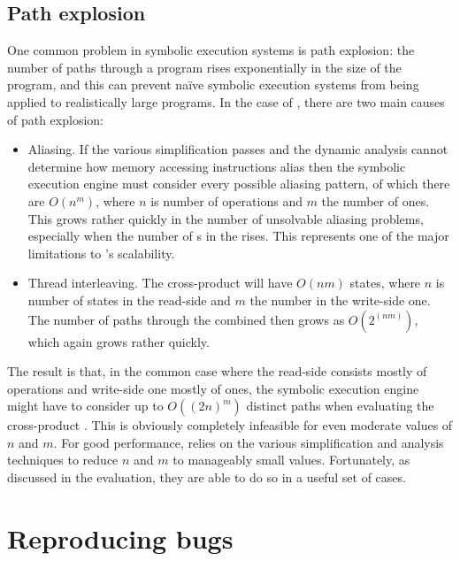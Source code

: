 \subsection{Path explosion}

One common problem in symbolic execution systems is path explosion:
the number of paths through a program rises exponentially in the size
of the program, and this can prevent na\"ive symbolic execution
systems from being applied to realistically large programs.  In the
case of \technique, there are two main causes of path explosion:

\begin{itemize}
\item
  Aliasing.  If the various simplification passes and the dynamic
  analysis cannot determine how memory accessing instructions alias
  then the symbolic execution engine must consider every possible
  aliasing pattern, of which there are $O(n^m)$, where $n$ is number
  of  operations and $m$ the number of  ones.
  This grows rather quickly in the number of unsolvable aliasing
  problems, especially when the number of s in the
  {\StateMachine} rises.  This represents one of the major limitations
  to \technique's scalability.
\item
  Thread interleaving.  The cross-product {\StateMachine} will have
  $O(nm)$ states, where $n$ is number of states in the read-side
  {\StateMachine} and $m$ the number in the write-side one.  The
  number of paths through the combined {\StateMachine} then grows as
  $O(2^{(nm)})$, which again grows rather quickly.
\end{itemize}

The result is that, in the common case where the read-side
{\StateMachine} consists mostly of  operations and
write-side one mostly of  ones, the symbolic execution
engine might have to consider up to $O((2n)^m)$ distinct paths when
evaluating the cross-product {\StateMachine}.  This is obviously
completely infeasible for even moderate values of $n$ and $m$.  For
good performance, {\technique} relies on the various simplification
and analysis techniques to reduce $n$ and $m$ to manageably small
values.  Fortunately, as discussed in the evaluation, they are able to
do so in a useful set of cases.

\section{Reproducing bugs}
\label{sect:reproducing_bugs}

